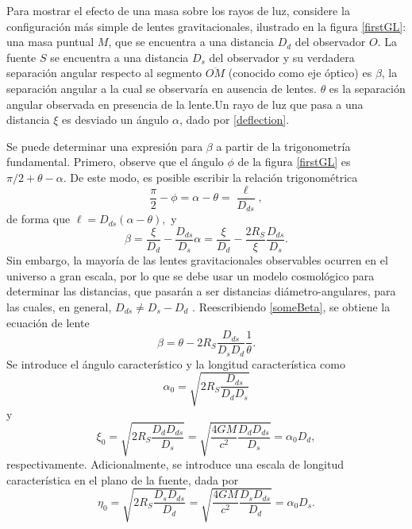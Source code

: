Para mostrar el efecto de una masa sobre los rayos de luz, considere la configuración más simple de lentes gravitacionales, ilustrado en la figura \ref{firstGL}: una masa puntual $M$, que se encuentra a una distancia $D_d$ del observador $O$. La fuente $S$ se encuentra a una distancia $D_s$ del observador y su verdadera separación angular respecto al segmento $\overline{OM}$ (conocido como eje óptico) es $\beta$, la separación angular a la cual se observaría en ausencia de lentes. $\theta$ es la separación angular observada en presencia de la lente.Un rayo de luz que pasa a una distancia $\xi$ es desviado un ángulo $\alpha$, dado por \eqref{deflection}.

Se puede determinar una expresión para $\beta$ a partir de la trigonometría fundamental. Primero, observe que el ángulo $\phi$ de la figura \ref{firstGL} es $\pi/2+\theta-\alpha$. De este modo, es posible escribir la relación trigonométrica
$$\frac{\pi}{2}-\phi=\alpha-\theta=\frac{\ell}{D_{ds}},$$
de forma que $\ell=D_{ds}(\alpha-\theta),$ y
\begin{equation}\label{someBeta}
	\beta=\frac{\xi}{D_d}-\frac{D_{ds}}{D_s}\alpha=\frac{\xi}{D_d}-\frac{2R_S}{\xi}\frac{D_{ds}}{D_s}.
\end{equation}
Sin embargo, la mayoría de las lentes gravitacionales observables ocurren en el universo a gran escala, por lo que se debe usar un modelo cosmológico para determinar las distancias, que pasarán a ser distancias diámetro-angulares, para las cuales, en general, $D_{ds}\neq D_s-D_d$ \cite{schneider_ehlers_falco_1992}. Reescribiendo \eqref{someBeta}, se obtiene la ecuación de lente
\begin{equation}\label{lensEquation}
\boxed{	\beta=\theta-2R_S\frac{D_{ds}}{D_sD_d}\frac{1}{\theta}.}
\end{equation}
Se introduce el ángulo característico y la longitud característica como
\begin{equation}
	\alpha_0=\sqrt{2R_S\frac{D_{ds}}{D_dD_s}}
\end{equation}
y
\begin{equation}
	\xi_0=\sqrt{2R_S\frac{D_dD_{ds}}{D_s}}=\sqrt{\frac{4GM}{c^2}\frac{D_dD_{ds}}{D_s}}=\alpha_0D_d,
\end{equation}
respectivamente. Adicionalmente, se introduce una escala de longitud característica en el plano de la fuente, dada por
\begin{equation}
	\eta_0=\sqrt{2R_S\frac{D_sD_{ds}}{D_d}}=\sqrt{\frac{4GM}{c^2}\frac{D_sD_{ds}}{D_d}}=\alpha_0D_s.
\end{equation}
